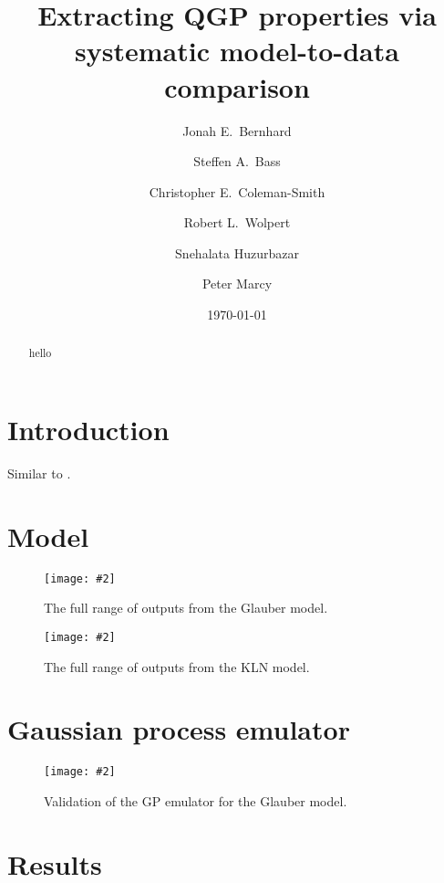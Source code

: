 \documentclass[aps, prc, reprint, amsmath]{revtex4-1}
\newcommand{\widefig}[3][t]{
  \begin{figure*}[#1]
    \texttt{[image: \#2]}
    \caption{\label{fig:#2}#3}
  \end{figure*}
}
\begin{document}
\title{Extracting QGP properties via systematic model-to-data comparison}

\author{Jonah E.\ Bernhard}
\author{Steffen A.\ Bass}
\author{Christopher E.\ Coleman-Smith}
\author{Robert L.\ Wolpert}

\author{Snehalata Huzurbazar}

\author{Peter Marcy}


\date{\today}

\begin{abstract}
  hello
\end{abstract}

\maketitle


\section{Introduction}

Similar to \cite{pratt-mtd, soltz-mtd}.


\section{Model}

\cite{bass-dumitru, nonaka-bass, song}
\cite{glauber}
\cite{kln}
\cite{vish}
\cite{cooper-frye}
\cite{iss}
\cite{urqmd1, urqmd2}
\cite{iebe}

\widefig{prior_draws_glb}{
  The full range of outputs from the Glauber model.
}

\widefig{prior_draws_kln}{
  The full range of outputs from the KLN model.
}


\section{Gaussian process emulator}

\cite{gpml}

\widefig{validation_glb}{
  Validation of the GP emulator for the Glauber model.
}


\section{Results}

\cite{alice-cumulants}
\cite{osu1, osu2}
\end{document}
